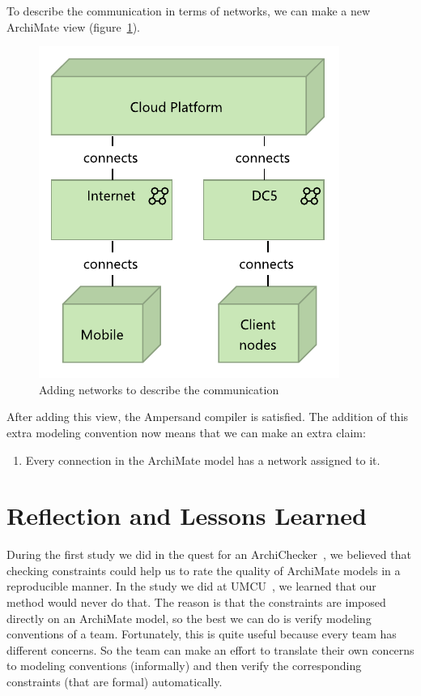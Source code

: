 \documentclass[sn-vancouver]{sn-jnl}%
\theoremstyle{thmstyleone}%
\theoremstyle{thmstyletwo}%
\theoremstyle{thmstylethree}%
\begin{document}
To describe the communication in terms of networks, we can make a new ArchiMate view (figure~\ref{fig: Network connections}).
\begin{figure}[b]
   \centering
   \includegraphics[clip=true, scale=0.9]{Network connections.pdf}
   \caption{Adding networks to describe the communication}
   \label{fig: Network connections}
\end{figure}
After adding this view, the Ampersand compiler is satisfied.
The addition of this extra modeling convention now means that we can make an extra claim:
\begin{enumerate}
    \item Every connection in the ArchiMate model has a network assigned to it.
\end{enumerate}

\section{Reflection and Lessons Learned}\label{reflection}
During the first study we did in the quest for an ArchiChecker~\cite{filetenterprise},
we believed that checking constraints could help us to rate the quality of ArchiMate models in a reproducible manner.
In the study we did at UMCU~\cite{iceis22}, we learned that our method would never do that.
The reason is that the constraints are imposed directly on an ArchiMate model, so the best we can do is verify modeling conventions of a team.
Fortunately, this is quite useful because every team has different concerns.
So the team can make an effort to translate their own concerns to modeling conventions (informally)
and then verify the corresponding constraints (that are formal) automatically.
\end{document}
